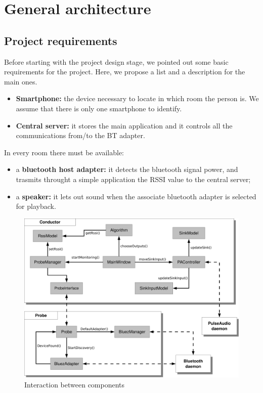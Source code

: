 \documentclass[conference]{./IEEEtran}
\begin{document}
\section{General architecture}

\subsection{Project requirements}
Before starting with the project design stage, we pointed out some basic requirements for the project. Here, we propose a list and a description for the main ones.
\begin{itemize}
\item{\textbf{Smartphone:}} the device necessary to locate in which room the person is. We assume that there is only one smartphone to identify.  
\item{\textbf{Central server:}} it stores the main application and it controls all the communications from/to the BT adapter.
\end{itemize}
In every room there must be available:
\begin{itemize}
\item{a \textbf{bluetooth host adapter:}} it detects the bluetooth signal power, and trasmits throught a simple application the RSSI value to the central server; 
\item{a \textbf{speaker:}} it lets out sound when the associate bluetooth adapter is selected for playback.
\end{itemize}

\begin{figure}[h]
\centering
\includegraphics[scale = 0.3]{architettura.pdf}
\caption{Interaction between components}
\label{arch}
\end{figure}
\end{document}

